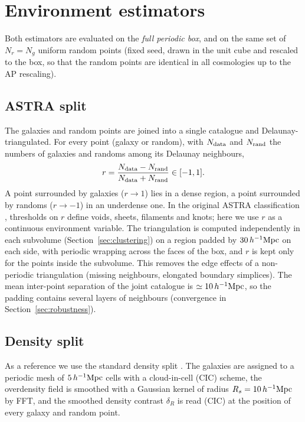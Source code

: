 \section{Environment estimators}
\label{sec:env}

Both estimators are evaluated on the \emph{full periodic box}, and on the same set of $N_r = N_g$ uniform random points (fixed seed, drawn in the unit cube and rescaled to the box, so that the random points are identical in all cosmologies up to the AP rescaling).

\subsection{ASTRA split}

The galaxies and random points are joined into a single catalogue and Delaunay-triangulated. For every point (galaxy or random), with $N_{\rm data}$ and $N_{\rm rand}$ the numbers of galaxies and randoms among its Delaunay neighbours,
\begin{equation}
r = \frac{N_{\rm data}-N_{\rm rand}}{N_{\rm data}+N_{\rm rand}} \in [-1,1].
\label{eq:astra_r}
\end{equation}
A point surrounded by galaxies ($r\to1$) lies in a dense region, a point surrounded by randoms ($r\to-1$) in an underdense one. In the original ASTRA classification \cite{ASTRA}, thresholds on $r$ define voids, sheets, filaments and knots; here we use $r$ as a continuous environment variable. The triangulation is computed independently in each subvolume (Section~\ref{sec:clustering}) on a region padded by $30\,h^{-1}\mathrm{Mpc}$ on each side, with periodic wrapping across the faces of the box, and $r$ is kept only for the points inside the subvolume. This removes the edge effects of a non-periodic triangulation (missing neighbours, elongated boundary simplices). The mean inter-point separation of the joint catalogue is $\simeq10\,h^{-1}\mathrm{Mpc}$, so the padding contains several layers of neighbours (convergence in Section~\ref{sec:robustness}).

\subsection{Density split}

As a reference we use the standard density split \cite{Paillas2023}. The galaxies are assigned to a periodic mesh of $5\,h^{-1}\mathrm{Mpc}$ cells with a cloud-in-cell (CIC) scheme, the overdensity field is smoothed with a Gaussian kernel of radius $R_s=10\,h^{-1}\mathrm{Mpc}$ by FFT, and the smoothed density contrast $\delta_R$ is read (CIC) at the position of every galaxy and random point.

